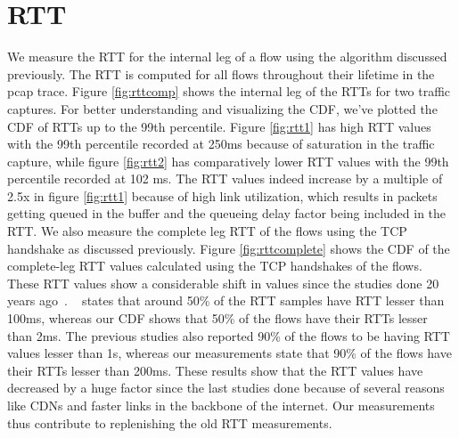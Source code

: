 
\section{RTT}
We measure the RTT for the internal leg of a flow using the algorithm discussed previously. The RTT is computed for all flows throughout their lifetime in the pcap trace. Figure \ref{fig:rttcomp} shows the internal leg of the RTTs for two traffic captures. For better understanding and visualizing the CDF, we've plotted the CDF of RTTs up to the 99th percentile. Figure \ref{fig:rtt1} has high RTT values with the 99th percentile recorded at 250ms because of saturation in the traffic capture, while figure \ref{fig:rtt2} has comparatively lower RTT values with the 99th percentile recorded at 102 ms. The RTT values indeed increase by a multiple of 2.5x in figure \ref{fig:rtt1} because of high link utilization, which results in packets getting queued in the buffer and the queueing delay factor being included in the RTT. We also measure the complete leg RTT of the flows using the TCP handshake as discussed previously. Figure \ref{fig:rttcomplete} shows the CDF of the complete-leg RTT values calculated using the TCP handshakes of the flows. These RTT values show a considerable shift in values since the studies done 20 years ago~\cite{tcprtt-imc03}. ~\cite{tcprtt-imc03} states that around 50\% of the RTT samples have RTT lesser than 100ms, whereas our CDF shows that 50\% of the flows have their RTTs lesser than 2ms. The previous studies also reported 90\% of the flows to be having RTT values lesser than 1s, whereas our measurements state that 90\% of the flows have their RTTs lesser than 200ms. These results show that the RTT values have decreased by a huge factor since the last studies done because of several reasons like CDNs and faster links in the backbone of the internet. Our measurements thus contribute to replenishing the old RTT measurements.

